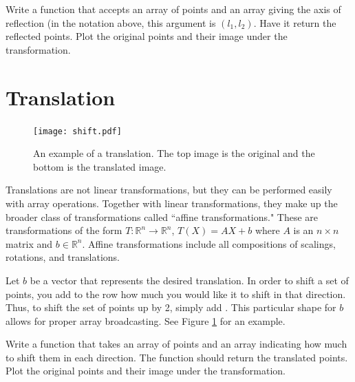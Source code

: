 \begin{problem}
Write a function that accepts an array of points and an array giving the axis of
reflection (in the notation above, this argument is $(l_1, l_2)$.
Have it return the reflected points.
Plot the original points and their image under the transformation.
\end{problem}

\section*{Translation}

\begin{figure}
\centering
\texttt{[image: shift.pdf]}
\caption{
An example of a translation.
The top image is the original and the bottom is the translated image.}
\label{basis:translation}
\end{figure}

Translations are not linear transformations, but they can be performed easily with array operations.
Together with linear transformations, they make up the broader class of transformations called
``affine transformations."
These are transformations of the form $T: \mathbb{R}^n \to \mathbb{R}^n$, $T(X) = AX + b$ where $A$ is
an $n\times n$ matrix and $b \in \mathbb{R}^n$.
Affine transformations include all compositions of scalings, rotations, and translations.


Let $b$ be a vector that represents the desired translation.
In order to shift a set of points, you add to the row how much you would like it to shift
in that direction. Thus, to shift the set of points up by 2, simply add .
This particular shape for $b$ allows for proper array broadcasting.
See Figure \ref{basis:translation} for an example.

\begin{problem}
Write a function that takes an array of points and an array indicating how much to shift
them in each direction. The function should return the translated points.
Plot the original points and their image under the transformation.
\end{problem}

